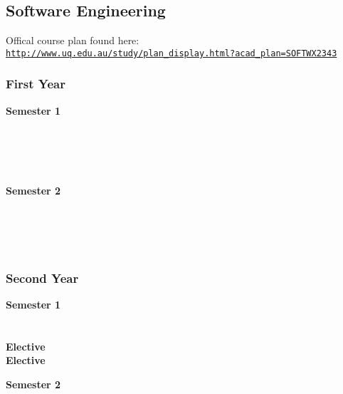 \subsection{Software Engineering}

Offical course plan found here: \\ 
\href{http://www.uq.edu.au/study/plan_display.html?acad_plan=SOFTWX2343}{\nolinkurl{http://www.uq.edu.au/study/plan_display.html?acad_plan=SOFTWX2343}}

\subsubsection{First Year}
\begin{center}
\begin{multicols}{2}
\textbf{Semester 1} \\
 \\
 \\
 \\
 \\
\vfill
\columnbreak

\textbf{Semester 2} \\
 \\
 \\
 \\
 \\
\end{multicols}
\end{center}

\subsubsection{Second Year}
\begin{center}
\begin{multicols}{2}
\textbf{Semester 1} \\
 \\
 \\
\textbf{Elective} \\
\textbf{Elective} \\
\vfill
\columnbreak

\textbf{Semester 2} \\
 \\
 \\
 \\
 \\
\end{multicols}
\end{center}

